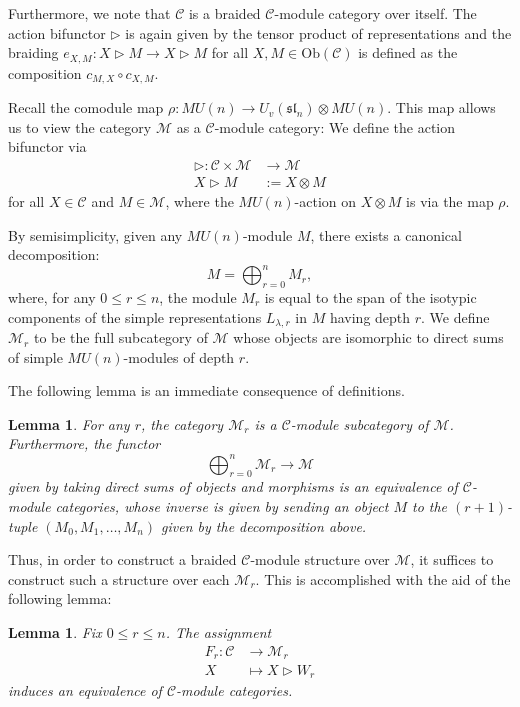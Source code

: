 \documentclass{amsart}
\numberwithin{equation}{section}
\theoremstyle{theorem}
\newtheorem{lemma}[theorem]{Lemma}
\theoremstyle{definition}
\newcommand{\cc}{\mathcal{C}}
\newcommand{\mm}{\mathcal{M}}
\newcommand{\sll}{\mathfrak{sl}}
\newcommand{\uvsln}{U_v(\sll_n)}
\begin{document}
Furthermore, we note that $\cc$ is a braided $\cc$-module category over itself. The action bifunctor $\rhd$ is again given by the tensor product of representations and the braiding $e_{X,M}:X\rhd M\to X\rhd M$ for all $X,M\in \mathrm{Ob}(\cc)$ is defined as the composition $c_{M,X}\circ c_{X,M}$.

Recall the comodule map $\rho:MU(n)\to \uvsln\otimes MU(n)$. This map allows us to view the category $\mm$ as a $\cc$-module category: We define the action bifunctor via
\begin{align*}
\rhd:\cc\times\mm&\to \mm\\
X\rhd M&:=X\otimes M
\end{align*}
for all $X\in \cc$ and $M\in \mm$, where the $MU(n)$-action on $X\otimes M$ is via the map $\rho$.

By semisimplicity, given any $MU(n)$-module $M$, there exists a canonical decomposition:
\[M=\bigoplus_{r=0}^n M_r,\]
where, for any $0\leq r\leq n$, the module $M_r$ is equal to the span of the isotypic components of the simple representations $L_{\lambda,r}$ in $M$ having depth $r$. We define $\mm_r$ to be the full subcategory of $\mm$ whose objects are isomorphic to direct sums of simple $MU(n)$-modules of depth $r$.

The following lemma is an immediate consequence of definitions.

\begin{lemma}
For any $r$, the category $\mm_r$ is a $\cc$-module subcategory of $\mm$. Furthermore, the functor
\[\bigoplus_{r=0}^n \mm_r \to \mm\]
given by taking direct sums of objects and morphisms is an equivalence of $\cc$-module categories, whose inverse is given by sending an object $M$ to the $(r+1)$-tuple $(M_0, M_1, \dots, M_n)$ given by the decomposition above.
\end{lemma}

Thus, in order to construct a braided $\cc$-module structure over $\mm$, it suffices to construct such a structure over each $\mm_r$. This is accomplished with the aid of the following lemma:

\begin{lemma}
Fix $0\leq r\leq n$. The assignment
\begin{align*}
F_r:\cc&\to \mm_r\\
X&\mapsto X\rhd W_r
\end{align*}
induces an equivalence of $\cc$-module categories.
\end{lemma}
\end{document}
